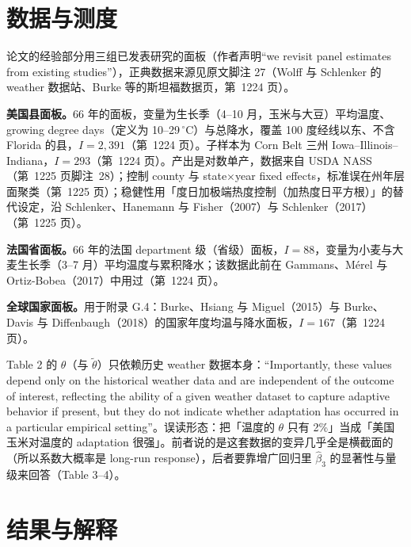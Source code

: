 \section{数据与测度}

论文的经验部分用三组已发表研究的面板（作者声明``we revisit panel estimates from existing studies''\citep[第~1224 页]{merel2021climate}），正典数据来源见原文脚注 27（Wolff 与 Schlenker 的 weather 数据站、Burke 等的斯坦福数据页，第~1224 页）。

\textbf{美国县面板。}66 年的面板，变量为生长季（4--10 月，玉米与大豆）平均温度、growing degree days（定义为 10--29\,$^\circ$C）与总降水，覆盖 100 度经线以东、不含 Florida 的县，$I=2{,}391$（第~1224 页）。子样本为 Corn Belt 三州 Iowa--Illinois--Indiana，$I=293$（第~1224 页）。产出是对数单产，数据来自 USDA NASS（第~1225 页脚注~28）；控制 county 与 state$\times$year fixed effects，标准误在州年层面聚类（第~1225 页）；稳健性用「度日加极端热度控制（加热度日平方根）」的替代设定，沿 Schlenker、Hanemann 与 Fisher（2007）与 Schlenker（2017）（第~1225 页）。

\textbf{法国省面板。}66 年的法国 department 级（省级）面板，$I=88$，变量为小麦与大麦生长季（3--7 月）平均温度与累积降水；该数据此前在 Gammans、Mérel 与 Ortiz-Bobea（2017）中用过（第~1224 页）。

\textbf{全球国家面板。}用于附录 G.4：Burke、Hsiang 与 Miguel（2015）与 Burke、Davis 与 Diffenbaugh（2018）的国家年度均温与降水面板，$I=167$（第~1224 页）。

\begin{pitfall}
Table 2 的 $\theta$（与 $\widetilde{\theta}$）只依赖历史 weather 数据本身：``Importantly, these values depend only on the historical weather data and are independent of the outcome of interest, reflecting the ability of a given weather dataset to capture adaptive behavior if present, but they do not indicate whether adaptation has occurred in a particular empirical setting''\citep[第~1225 页]{merel2021climate}。误读形态：把「温度的 $\theta$ 只有 2\%」当成「美国玉米对温度的 adaptation 很强」。前者说的是这套数据的变异几乎全是横截面的（所以系数大概率是 long-run response），后者要靠增广回归里 $\widehat{\beta}_3$ 的显著性与量级来回答（Table 3--4）。
\end{pitfall}

\section{结果与解释}


